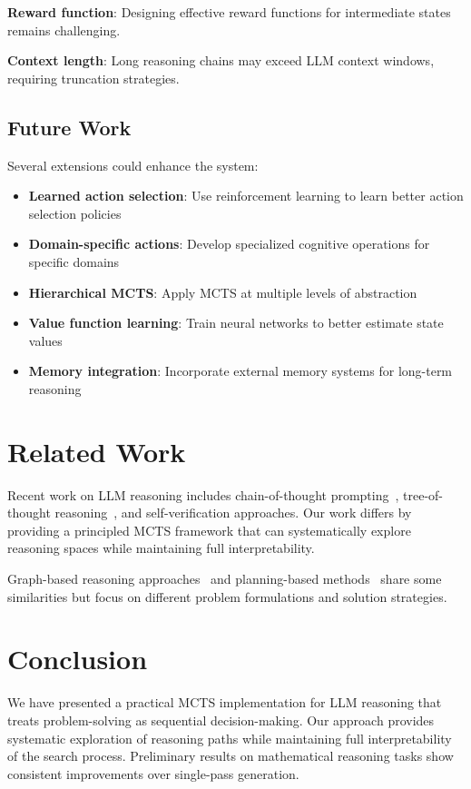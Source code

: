 \documentclass[conference]{IEEEtran}
\begin{document}
\textbf{Reward function}: Designing effective reward functions for intermediate states remains challenging.

\textbf{Context length}: Long reasoning chains may exceed LLM context windows, requiring truncation strategies.

\subsection{Future Work}

Several extensions could enhance the system:

\begin{itemize}
\item \textbf{Learned action selection}: Use reinforcement learning to learn better action selection policies
\item \textbf{Domain-specific actions}: Develop specialized cognitive operations for specific domains
\item \textbf{Hierarchical MCTS}: Apply MCTS at multiple levels of abstraction
\item \textbf{Value function learning}: Train neural networks to better estimate state values
\item \textbf{Memory integration}: Incorporate external memory systems for long-term reasoning
\end{itemize}

\section{Related Work}

Recent work on LLM reasoning includes chain-of-thought prompting~\cite{wei2022chain}, tree-of-thought reasoning~\cite{yao2023tree}, and self-verification approaches. Our work differs by providing a principled MCTS framework that can systematically explore reasoning spaces while maintaining full interpretability.

Graph-based reasoning approaches~\cite{besta2024graph} and planning-based methods~\cite{huang2022language} share some similarities but focus on different problem formulations and solution strategies.

\section{Conclusion}

We have presented a practical MCTS implementation for LLM reasoning that treats problem-solving as sequential decision-making. Our approach provides systematic exploration of reasoning paths while maintaining full interpretability of the search process. Preliminary results on mathematical reasoning tasks show consistent improvements over single-pass generation.
\end{document}
